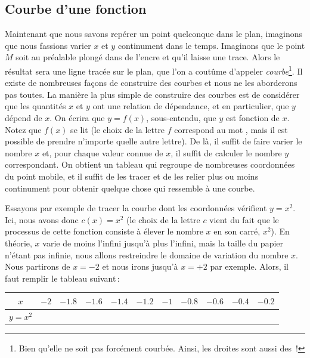 		\subsection{Courbe d'une fonction}
			Maintenant que nous savons repérer un point quelconque dans le plan, imaginons que nous fassions varier $x$ et $y$ continument dans le temps. Imaginons que le point $M$ soit au préalable plongé dans de l'encre et qu'il laisse une trace. Alors le résultat sera une ligne tracée sur le plan, que l'on a coutûme d'appeler \emph{courbe}\footnote{Bien qu'elle ne soit pas forcément courbée. Ainsi, les droites sont aussi des \,!}. Il existe de nombreuses façons de construire des courbes et nous ne les aborderons pas toutes. La manière la plus simple de construire des courbes est de considérer que les quantités $x$ et $y$ ont une relation de dépendance, et en particulier, que $y$ dépend de $x$. On écrira que $y=f(x)$, sous-entendu, que $y$ est fonction de $x$. Notez que $f(x)$ se lit  (le choix de la lettre $f$ correspond au mot , mais il est possible de prendre n'importe quelle autre lettre). De là, il suffit de faire varier le nombre $x$ et, pour chaque valeur connue de $x$, il suffit de calculer le nombre $y$ correspondant. On obtient un tableau qui regroupe de nombreuses coordonnées du point mobile, et il suffit de les tracer et de les relier plus ou moins continument pour obtenir quelque chose qui ressemble à une courbe.

			Essayons par exemple de tracer la courbe dont les coordonnées vérifient $y=x^2$. Ici, nous avons donc $c(x)=x^2$ (le choix de la lettre $c$ vient du fait que le processus de cette fonction consiste à élever le nombre $x$ en son carré, $x^2$). En théorie, $x$ varie de moins l'infini jusqu'à plus l'infini, mais la taille du papier n'étant pas infinie, nous allons restreindre le domaine de variation du nombre $x$. Nous partirons de $x=-2$ et nous irons jusqu'à $x=+2$ par exemple. Alors, il faut remplir le tableau suivant\,:

			\begin{tabular}{|c|c|c|c|c|c|c|c|c|c|c|}
				\hline
				$x$     &$  -2 $&$ -1.8 $&$ -1.6 $&$ -1.4 $&$ -1.2 $&$ -1 $&$ -0.8 $&$ -0.6 $&$ -0.4 $&$ -0.2 $\\
				\hline
				$y=x^2$ &       &         &       &        &        &      &         &       &         &        \\
				\hline
			\end{tabular}

			\vspace{0.3cm}

